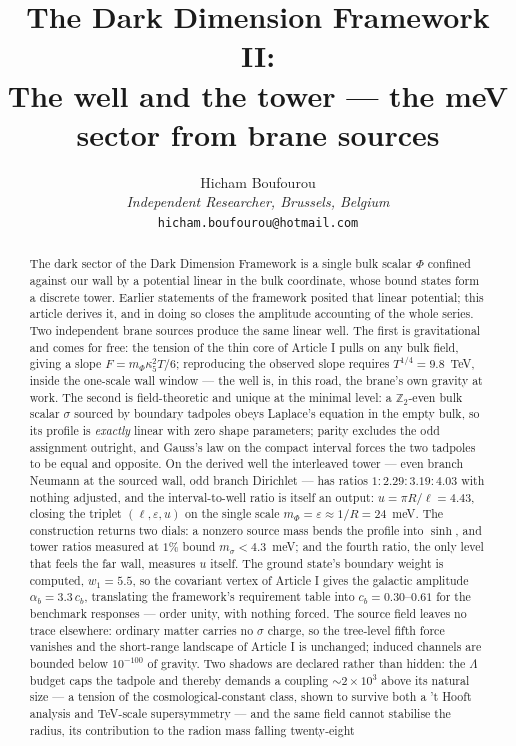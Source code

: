 
\graphicspath{{figures/}{../figures/}}
\title{\textbf{The Dark Dimension Framework II:\\ The well and the tower --- the meV sector from brane sources}}
\author{Hicham Boufourou\\ \small\textit{Independent Researcher, Brussels, Belgium}\\ \small\texttt{hicham.boufourou@hotmail.com}}
\maketitle
\begin{abstract}
\noindent The dark sector of the Dark Dimension Framework is a single bulk scalar $\Phi$ confined against our wall by a potential linear in the bulk coordinate, whose bound states form a discrete tower. Earlier statements of the framework posited that linear potential; this article derives it, and in doing so closes the amplitude accounting of the whole series. Two independent brane sources produce the same linear well. The first is gravitational and comes for free: the tension of the thin core of Article I pulls on any bulk field, giving a slope $F=m_{\Phi}\kappa_{5}^{2}T/6$; reproducing the observed slope requires $T^{1/4}=9.8$~TeV, inside the one-scale wall window --- the well is, in this road, the brane's own gravity at work. The second is field-theoretic and unique at the minimal level: a $\mathbb{Z}_{2}$-even bulk scalar $\sigma$ sourced by boundary tadpoles obeys Laplace's equation in the empty bulk, so its profile is \emph{exactly} linear with zero shape parameters; parity excludes the odd assignment outright, and Gauss's law on the compact interval forces the two tadpoles to be equal and opposite. On the derived well the interleaved tower --- even branch Neumann at the sourced wall, odd branch Dirichlet --- has ratios $1:2.29:3.19:4.03$ with nothing adjusted, and the interval-to-well ratio is itself an output: $u=\pi R/\ell=4.43$, closing the triplet $(\ell,\varepsilon,u)$ on the single scale $m_{\Phi}=\varepsilon\approx1/R=24$~meV. The construction returns two dials: a nonzero source mass bends the profile into $\sinh$, and tower ratios measured at $1\%$ bound $m_{\sigma}<4.3$~meV; and the fourth ratio, the only level that feels the far wall, measures $u$ itself. The ground state's boundary weight is computed, $w_{1}=5.5$, so the covariant vertex of Article I gives the galactic amplitude $\alpha_{b}=3.3\,c_{b}$, translating the framework's requirement table into $c_{b}=0.30$--$0.61$ for the benchmark responses --- order unity, with nothing forced. The source field leaves no trace elsewhere: ordinary matter carries no $\sigma$ charge, so the tree-level fifth force vanishes and the short-range landscape of Article I is unchanged; induced channels are bounded below $10^{-100}$ of gravity. Two shadows are declared rather than hidden: the $\Lambda$ budget caps the tadpole and thereby demands a coupling $\sim2\times10^{3}$ above its natural size --- a tension of the cosmological-constant class, shown to survive both a 't Hooft analysis and TeV-scale supersymmetry --- and the same field cannot stabilise the radius, its contribution to the radion mass falling twenty-eight 
\end{abstract}
